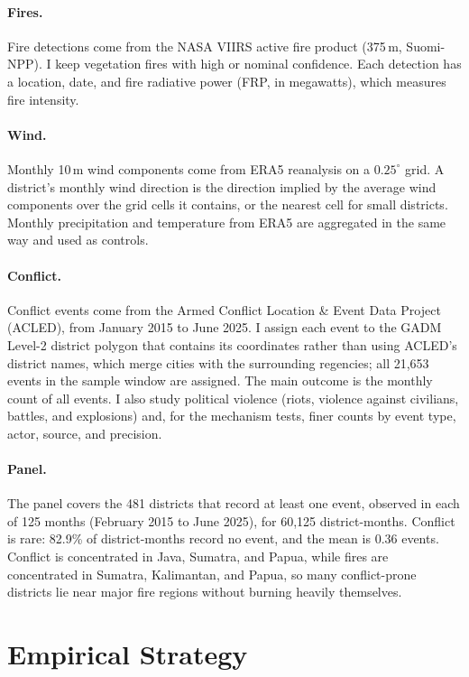 \documentclass[12pt]{article}
\begin{document}
\paragraph{Fires.} Fire detections come from the NASA VIIRS active fire product (375\,m, Suomi-NPP). I keep vegetation fires with high or nominal confidence. Each detection has a location, date, and fire radiative power (FRP, in megawatts), which measures fire intensity.

\paragraph{Wind.} Monthly 10\,m wind components come from ERA5 reanalysis \citep{hersbach2023era5} on a $0.25^{\circ}$ grid. A district's monthly wind direction is the direction implied by the average wind components over the grid cells it contains, or the nearest cell for small districts. Monthly precipitation and temperature from ERA5 are aggregated in the same way and used as controls.

\paragraph{Conflict.} Conflict events come from the Armed Conflict Location \& Event Data Project (ACLED), from January 2015 to June 2025. I assign each event to the GADM Level-2 district polygon that contains its coordinates rather than using ACLED's district names, which merge cities with the surrounding regencies; all 21,653 events in the sample window are assigned. The main outcome is the monthly count of all events. I also study political violence (riots, violence against civilians, battles, and explosions) and, for the mechanism tests, finer counts by event type, actor, source, and precision.

\paragraph{Panel.} The panel covers the 481 districts that record at least one event, observed in each of 125 months (February 2015 to June 2025), for 60,125 district-months. Conflict is rare: 82.9\% of district-months record no event, and the mean is 0.36 events. Conflict is concentrated in Java, Sumatra, and Papua, while fires are concentrated in Sumatra, Kalimantan, and Papua, so many conflict-prone districts lie near major fire regions without burning heavily themselves.

\section{Empirical Strategy}
\label{sec:empirical}
\end{document}
